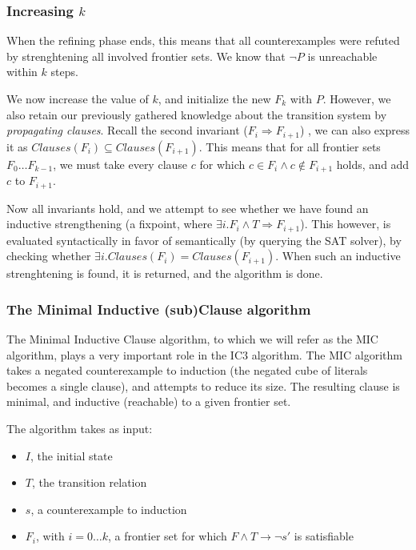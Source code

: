 \documentclass[a4paper]{article}
\begin{document}
\subsubsection{Increasing $k$}
When the refining phase ends, this means that all counterexamples were refuted by strenghtening all involved frontier sets. We know %
that $\lnot P$ is unreachable within $k$ steps.

We now increase the value of $k$, and initialize the new $F_k$ with $P$.
However, we also retain our previously gathered knowledge about the transition system by \emph{propagating clauses}. Recall the second invariant ($F_i \Rightarrow F_{i+1}$) , we can also express it as $Clauses(F_i) \subseteq Clauses(F_{i+1})$. This means that for all frontier sets $F_0 \ldots F_{k-1}$, we must take every clause $c$ for which $c \in F_i \land c\notin F_{i+1}$ holds, and add $c$ to $F_{i+1}$.

Now all invariants hold, and we attempt to see whether we have found an inductive strengthening (a fixpoint, where $\exists i. F_i \land T \Rightarrow F_{i+1}$). This however, is evaluated syntactically in favor of semantically (by querying the SAT solver), by checking whether $\exists i. Clauses(F_i) = Clauses(F_{i+1})$. When such an inductive strenghtening is found, it is returned, and the algorithm is done.

\newpage
\subsubsection{The Minimal Inductive (sub)Clause algorithm}
\label{sec:MIC}
The Minimal Inductive Clause algorithm, to which we will refer as the MIC algorithm, plays a very important role in the IC3 algorithm. The MIC algorithm takes a negated counterexample to induction (the negated cube of literals becomes a single clause), and attempts to reduce its size. The resulting clause is minimal, and inductive (reachable) to a given frontier set.

The algorithm takes as input:
\begin{itemize}
\item $I$, the initial state
\item $T$, the transition relation
\item $s$, a counterexample to induction
\item $F_i$, with $i=0 \ldots k$, a frontier set for which $F \land T \rightarrow \lnot s'$ is satisfiable
\end{itemize}
\end{document}
